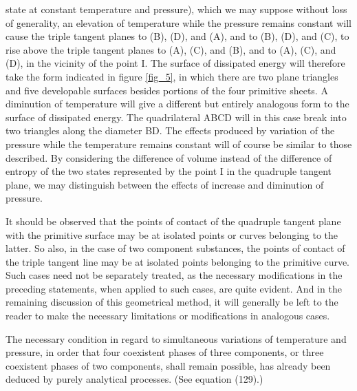\documentclass[12pt]{memoir}
\begin{document}
state at constant temperature and pressure), which we may suppose without loss of generality, an elevation of temperature while the pressure remains constant will cause the triple tangent planes to (B), (D), and (A), and to (B), (D), and (C), to rise above the triple tangent planes to (A), (C), and (B), and to (A), (C), and (D), in the vicinity of the point I.  The surface of dissipated energy will therefore take the form indicated in figure \ref{fig_5}, in which there are two plane triangles and five developable surfaces besides portions of the four primitive sheets. A diminution of temperature will give a different but entirely analogous form to the surface of dissipated energy. The quadrilateral ABCD will in this case break into two triangles along the diameter BD. The effects produced by variation of the pressure while the temperature remains constant will of course be similar to those described. By considering the difference of volume instead of the difference of entropy of the two states represented by the point I in the quadruple tangent plane, we may distinguish between the effects of increase and diminution of pressure.


It should be observed that the points of contact of the quadruple tangent plane with the primitive surface may be at isolated points or curves belonging to the latter. So also, in the case of two component substances, the points of contact of the triple tangent line may be at isolated points belonging to the primitive curve. Such cases need not be separately treated, as the necessary modifications in the preceding statements, when applied to such cases, are quite evident. And in the remaining discussion of this geometrical method, it will generally be left to the reader to make the necessary limitations or modifications in analogous cases.


The necessary condition in regard to simultaneous variations of temperature and pressure, in order that four coexistent phases of three components, or three coexistent phases of two components, shall remain possible, has already been deduced by purely analytical processes. (See equation (129).)
\end{document}
